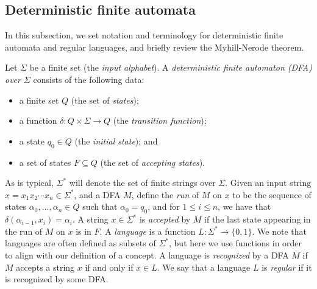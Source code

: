 \documentclass[runningheads]{llncs}
\DeclareMathOperator{\Ldim}{Ldim}
\DeclareMathOperator{\Cdim}{Cdim}
\DeclareMathOperator{\SCdim}{SCdim}
\begin{document}

\subsection{Deterministic finite automata}

In this subsection, we set notation and terminology for deterministic finite automata and regular languages, and briefly review the Myhill-Nerode theorem.

\begin{definition}
    Let $\Sigma$ be a finite set (the \emph{input alphabet}). 
    A \emph{deterministic finite automaton (DFA) over $\Sigma$} consists of the following data:
    \begin{itemize}
        \item a finite set $Q$ (the set of \emph{states}); 
        \item a function $\delta : Q \times \Sigma \to Q$ (the \emph{transition function});
        \item a state $q_0 \in Q$  (the \emph{initial state}); and
        \item a set of states $F \subseteq Q$  (the set of \emph{accepting states}).
    \end{itemize}
\end{definition}

As is typical, $\Sigma^*$ will denote the set of finite strings over $\Sigma$.
Given an input string $x = x_1 x_2 \cdots x_n \in \Sigma^*$, and a DFA $M$, define the \emph{run} of $M$ on $x$ to be the sequence of states $\alpha_0, \ldots, \alpha_n \in Q$ such that $\alpha_0 = q_0$, and for $1 \leq i \leq n$, we have that $\delta(\alpha_{i-1}, x_i) = \alpha_i$. 
A string $x \in \Sigma^*$ is \emph{accepted} by $M$ if the last state appearing in the run of $M$ on $x$ is in $F$.
A \emph{language} is a function $L : \Sigma^* \to \{0,1\}$.
We note that languages are often defined as subsets of $\Sigma^*$, but here we use functions in order to align with our definition of a concept.
A language is \emph{recognized} by a DFA $M$ if $M$ accepts a string $x$ if and only if $x \in L$.
We say that a language $L$ is \emph{regular} if it is recognized by some DFA.
\end{document}
